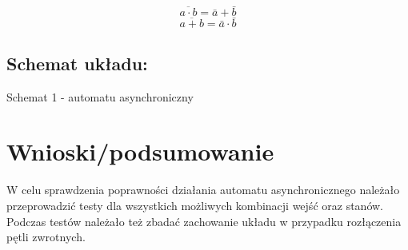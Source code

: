 \documentclass[12pt,a4paper]{article}
\begin{document}
			\begin{equation}
			\overline{a\cdot b}=\bar{a}+\bar{b}
			\end{equation}
			\begin{equation}
			\overline{a+b}=\bar{a}\cdot\bar{b}
			\end{equation}
		
		\subsection{Schemat układu:}
		
		\begin{center}
			Schemat 1 - automatu asynchroniczny
		\end{center}

	\section{Wnioski/podsumowanie}
	
			W celu sprawdzenia poprawności działania automatu asynchronicznego należało przeprowadzić testy dla wszystkich możliwych kombinacji wejść oraz stanów. Podczas testów należało też zbadać zachowanie układu w przypadku rozłączenia pętli zwrotnych.
	
\end{document}
